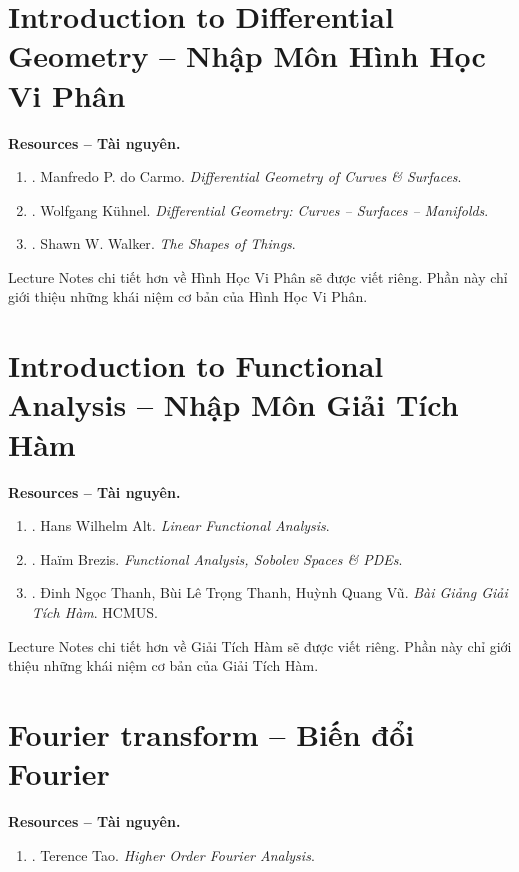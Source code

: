 \documentclass{article}
\begin{document}
\section{Introduction to Differential Geometry -- Nhập Môn Hình Học Vi Phân}
\textbf{\textsf{Resources -- Tài nguyên.}}
\begin{enumerate}
	\item \cite{Carmo2016}. {\sc Manfredo P. do Carmo}. {\it Differential Geometry of Curves \& Surfaces}.
	
	\item \cite{Kuhnel2015}. {\sc Wolfgang K\"{u}hnel}. {\it Differential Geometry: Curves -- Surfaces -- Manifolds}.
	
	\item \cite{Walker2015}. {\sc Shawn W. Walker}. {\it The Shapes of Things}.
\end{enumerate}
Lecture Notes chi tiết hơn về Hình Học Vi Phân sẽ được viết riêng. Phần này chỉ giới thiệu những khái niệm cơ bản của Hình Học Vi Phân.


\section{Introduction to Functional Analysis -- Nhập Môn Giải Tích Hàm}
\textbf{\textsf{Resources -- Tài nguyên.}}
\begin{enumerate}
	\item \cite{Alt2016}. {\sc Hans Wilhelm Alt}. {\it Linear Functional Analysis}.
	
	\item \cite{Brezis2011}. {\sc Ha\"im Brezis}. {\it Functional Analysis, Sobolev Spaces \& PDEs}.
	
	\item \cite{Thanh_Thanh_Vu_gth}. {\sc Đinh Ngọc Thanh, Bùi Lê Trọng Thanh, Huỳnh Quang Vũ}. {\it Bài Giảng Giải Tích Hàm}. HCMUS.
\end{enumerate}
Lecture Notes chi tiết hơn về Giải Tích Hàm sẽ được viết riêng. Phần này chỉ giới thiệu những khái niệm cơ bản của Giải Tích Hàm.


\section{Fourier transform -- Biến đổi Fourier}
\textbf{\textsf{Resources -- Tài nguyên.}}
\begin{enumerate}
	\item \cite{Tao_Fourier_analysis}. {\sc Terence Tao}. {\it Higher Order Fourier Analysis}.
\end{enumerate}
\end{document}
